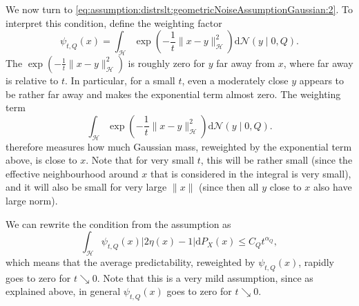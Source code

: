 \documentclass[letterpaper]{article} %
\newcommand{\hs}[1]{\mathcal{#1}} %
\newcommand{\Normal}{\mathcal{N}}
\begin{document}
We now turn to \eqref{eq:assumption:distrslt:geometricNoiseAssumptionGaussian:2}.
To interpret this condition, define the weighting factor
\begin{equation*}
    \psi_{t,Q}(x)=   \int_\hs{H} \exp\left(-\frac1t \|x-y\|_\hs{H}^2\right) \mathrm{d} \Normal(y\mid 0,Q).
\end{equation*}
The $\exp\left(-\frac1t \|x-y\|_\hs{H}^2\right)$ is roughly zero for $y$ far away from $x$, where far away is relative to $t$.
In particular, for a small $t$, even a moderately close $y$ appears to be rather far away and makes the exponential term almost zero.
The weighting term
\begin{equation}
    \int_\hs{H} \exp\left(-\frac1t \|x-y\|_\hs{H}^2\right) \mathrm{d} \Normal(y\mid 0,Q).
\end{equation}
therefore measures how much Gaussian mass, reweighted by the exponential term above, is close to $x$.
Note that for very small $t$, this will be rather small (since the effective neighbourhood around $x$ that is considered in the integral is very small),
and it will also be small for very large $\|x\|$ (since then all $y$ close to $x$ also have large norm).

We can rewrite the condition from the assumption as
\begin{equation*}
     \int_\hs{H} \psi_{t,Q}(x)|2\eta(x)-1|\mathrm{d}P_X(x)
    \leq C_Q t^{\alpha_Q},
\end{equation*}
which means that the average predictability, reweighted by $\psi_{t,Q}(x)$, rapidly goes to zero for $t \searrow 0$.
Note that this is a very mild assumption, since as explained above, in general $\psi_{t,Q}(x)$ goes to zero for $t \searrow 0$.
\end{document}

